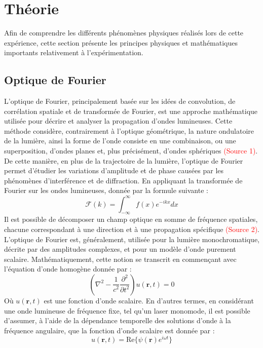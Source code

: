 \documentclass[11pt,letterpaper]{article}
\begin{document}
\section{Théorie}
Afin de comprendre les différents phénomènes physiques réalisés lors de cette expérience, cette section présente les principes physiques et mathématiques importants relativement à l'expérimentation.

\subsection{Optique de Fourier}\label{Fourier_optic}
L'optique de Fourier, principalement basée sur les idées de convolution, de corrélation spatiale et de transformée de Fourier, est une approche mathématique utilisée pour décrire et analyser la propagation d'ondes lumineuses. Cette méthode considère, contrairement à l'optique géométrique, la nature ondulatoire de la lumière, ainsi la forme de l'onde consiste en une combinaison, ou une superposition, d'ondes planes et, plus précisément, d'ondes sphériques \textcolor{red}{(Source 1)}. De cette manière, en plus de la trajectoire de la lumière, l'optique de Fourier permet d'étudier les variations d'amplitude et de phase causées par les phénomènes d'interférence et de diffraction. En appliquant la transformée de Fourier sur les ondes lumineuses, donnée par la formule suivante :
\begin{equation}
  \mathcal{F}(k)=\int_{-\infty}^{\infty}f(x)e^{-ikx}dx
\end{equation}
Il est possible de décomposer un champ optique en somme de fréquence spatiales, chacune correspondant à une direction et à une propagation spécifique \textcolor{red}{(Source 2)}. L'optique de Fourier est, généralement, utilisée pour la lumière monochromatique, décrite  par des amplitudes complexes, et pour un modèle d'onde purement scalaire. Mathématiquement, cette notion se transcrit en commençant avec l'équation d'onde homogène donnée par :
\begin{equation}
  \left(\nabla^{2}-\frac{1}{c^{2}}\frac{\partial^{2}}{\partial t^{2}}\right)u(\mathbf{r}, t)=0
\end{equation}
Où $u(\mathbf{r}, t)$ est une fonction d'onde scalaire. En d'autres termes, en considérant une onde lumineuse de fréquence fixe, tel qu'un laser monomode, il est possible d'assumer, à l'aide de la dépendance temporelle des solutions d'onde à la fréquence angulaire, que la fonction d'onde scalaire est donnée par :
\begin{equation}
  u(\mathbf{r}, t)=\mathrm{Re}\{\psi(\mathbf{r})e^{i\omega t}\}
\end{equation}
\end{document}
